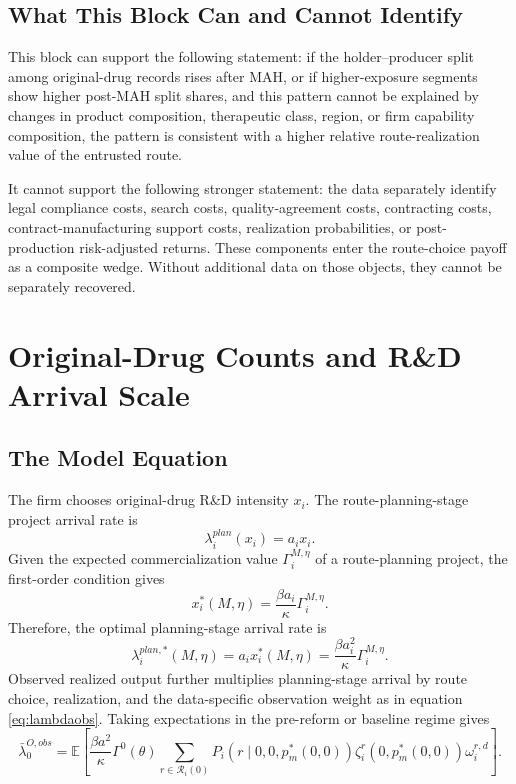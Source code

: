 \documentclass[12pt]{article}
\newcommand{\E}{\mathbb{E}}
\newcommand{\1}{\mathbf{1}}
\newcommand{\calR}{\mathcal{R}}
\begin{document}
\subsection{What This Block Can and Cannot Identify}

This block can support the following statement: if the holder--producer split among original-drug records rises after MAH, or if higher-exposure segments show higher post-MAH split shares, and this pattern cannot be explained by changes in product composition, therapeutic class, region, or firm capability composition, the pattern is consistent with a higher relative route-realization value of the entrusted route.

It cannot support the following stronger statement: the data separately identify legal compliance costs, search costs, quality-agreement costs, contracting costs, contract-manufacturing support costs, realization probabilities, or post-production risk-adjusted returns. These components enter the route-choice payoff as a composite wedge. Without additional data on those objects, they cannot be separately recovered.

\section{Original-Drug Counts and R\&D Arrival Scale}

\subsection{The Model Equation}

The firm chooses original-drug R\&D intensity $x_i$. The route-planning-stage project arrival rate is
\[
    \lambda_i^{plan}(x_i)=a_i x_i.
\]
Given the expected commercialization value $\Gamma_i^{M,\eta}$ of a route-planning project, the first-order condition gives
\[
    x_i^*(M,\eta)=\frac{\beta a_i}{\kappa}\Gamma_i^{M,\eta}.
\]
Therefore, the optimal planning-stage arrival rate is
\[
    \lambda_i^{plan,*}(M,\eta)=a_i x_i^*(M,\eta)
    =
    \frac{\beta a_i^2}{\kappa}\Gamma_i^{M,\eta}.
\]
Observed realized output further multiplies planning-stage arrival by route choice, realization, and the data-specific observation weight as in equation \eqref{eq:lambdaobs}.
Taking expectations in the pre-reform or baseline regime gives
\[
    \bar\lambda_0^{O,obs}
    =
    \E\left[
    \frac{\beta a^2}{\kappa}\Gamma^0(\theta)
    \sum_{r\in\calR_i(0)}
    P_i(r\mid0,0,p_m^*(0,0))\zeta_i^r(0,p_m^*(0,0))\omega_i^{r,d}
    \right].
\]
\end{document}
